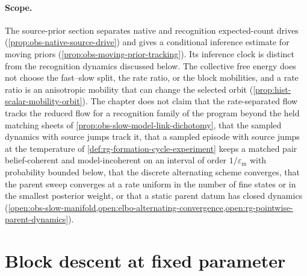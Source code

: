 \paragraph{Scope.}
The source-prior section separates native and recognition expected-count drives
(\cref{prop:obs-native-source-drive}) and gives a conditional inference estimate
for moving priors (\cref{prop:obs-moving-prior-tracking}). Its inference clock is
distinct from the recognition dynamics discussed below.
The collective free energy does not choose the fast--slow split, the rate ratio, or
the block mobilities, and a rate ratio is an anisotropic mobility that can change the
selected orbit (\cref{prop:hist-scalar-mobility-orbit}). The chapter does not claim
that the rate-separated flow tracks the reduced flow for a recognition family of the
program beyond the held matching sheets of
\cref{prop:obs-slow-model-link-dichotomy}, that the sampled dynamics with source
jumps track it, that a sampled episode with source jumps at the temperature of
\cref{def:rg-formation-cycle-experiment} keeps a matched pair belief-coherent and
model-incoherent on an interval of order $1/\varepsilon_{\mathrm m}$ with probability
bounded below, that the discrete alternating scheme converges, that the parent sweep
converges at a rate uniform in the number of fine states or in the smallest posterior
weight, or that a static parent datum has closed dynamics
(\cref{open:obs-slow-manifold,open:elbo-alternating-convergence,open:rg-pointwise-parent-dynamics}).

\section{Block descent at fixed parameter}
\label{sec:local-natural-gradient}

